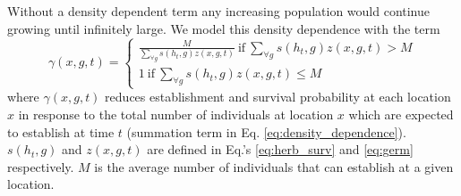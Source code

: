 \documentclass[12pt, a4paper]{article}
\begin{document}
Without a density dependent term any increasing population would continue growing until infinitely large. We model this density dependence with the term 
\begin{equation}\label{eq:density_dependence}
	\gamma(x, g, t) =
		\begin{cases}
			\frac{M}{\sum_{\forall g}s(h_t, g)z(x, g, t)} ~\text{if}~ \sum_{\forall g}s(h_t, g)z(x, g, t) > M \\
			1 ~\text{if}~ \sum_{\forall g}s(h_t, g)z(x, g, t) \leq M  
		\end{cases}
\end{equation}
where $\gamma(x, g, t)$ reduces establishment and survival probability at each location $x$ in response to the total number of individuals at location $x$ which are expected to establish at time $t$ (summation term in Eq. \ref{eq:density_dependence}). $s(h_t, g)$ and $z(x, g, t)$ are defined in Eq.'s \ref{eq:herb_surv} and \ref{eq:germ} respectively. $M$ is the average number of individuals that can establish at a given location. 

% 
%
\end{document}
